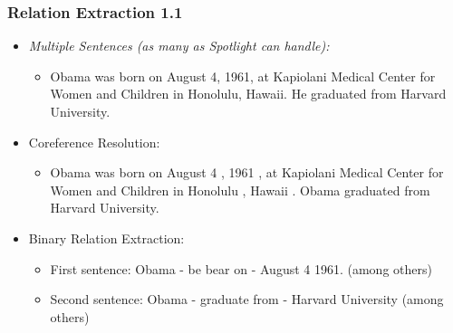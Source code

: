 \documentclass{beamer}
\begin{document}
\begin{frame}
\frametitle{Relation Extraction 1.1 }
\begin{example}[]
	\begin{itemize}
		\item \textit{Multiple Sentences (as many as Spotlight can handle):} \\
		\begin{itemize} \item Obama was born on August 4, 1961, at Kapiolani Medical Center for Women and Children in Honolulu, Hawaii. He graduated from Harvard University.
		\end{itemize}
		\item Coreference Resolution:  \begin{itemize} \item Obama was born on August 4 , 1961 , at Kapiolani Medical Center for Women and Children in Honolulu , Hawaii . Obama graduated from Harvard University. 
		\end{itemize}
		\item Binary Relation Extraction:  \begin{itemize} \item First sentence: Obama - be bear on - August 4 1961. (among others)
			\item Second sentence: Obama - graduate from - Harvard University (among others)
		\end{itemize}	 
	\end{itemize}
\end{example}
\end{frame}
\end{document}
